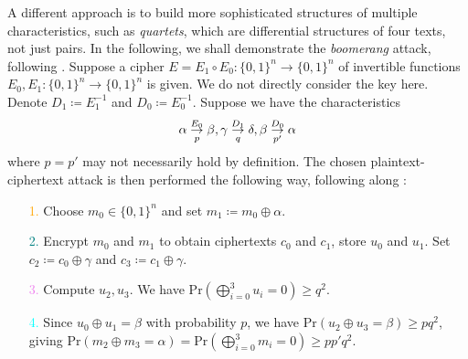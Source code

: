 \documentclass[10pt]{amsart}
\theoremstyle{definition}
\theoremstyle{remark}
\begin{document}
    A different approach is to build more sophisticated structures of multiple characteristics, such as \emph{quartets}, which are differential structures of four texts, not just pairs. In the following, we shall demonstrate the \emph{boomerang} attack, following \cite[pp. 162-164]{Knudsen}. Suppose a cipher \(E = E_1 \circ E_0\colon \{0, 1\}^n \to \{0, 1\}^n\) of invertible functions \(E_0, E_1\colon \{0, 1\}^n \to \{0, 1\}^n\) is given. We do not directly consider the key here. Denote \(D_1 \coloneqq E_1^{-1}\) and \(D_0 \coloneqq E_0^{-1}\). Suppose we have the characteristics
    \begin{align}
        \alpha \overunderset{E_0}{p}{\to} \beta, \gamma \overunderset{D_1}{q}{\to} \delta, \beta \overunderset{D_0}{p'}{\to} \alpha
    \end{align}
    where \(p = p'\) may not necessarily hold by definition. The chosen plaintext-ciphertext attack is then performed the following way, following along :
    \begin{enumerate}[wide]
        \item[\textcolor{orange}{1.}] Choose \(m_0 \in \{0, 1\}^n\) and set \(m_1 \coloneqq m_0 \oplus \alpha\).
        \item[\textcolor{teal}{2.}] Encrypt \(m_0\) and \(m_1\) to obtain ciphertexts \(c_0\) and \(c_1\), store \(u_0\) and \(u_1\). Set \(c_2 \coloneqq c_0 \oplus \gamma\) and \(c_3 \coloneqq c_1 \oplus \gamma\).
        \item[\textcolor{violet}{3.}] Compute \(u_2, u_3\). We have \(\text{Pr}(\bigoplus_{i=0}^3 u_i = 0) \geq q^2\).
        \item[\textcolor{cyan}{4.}] Since \(u_0 \oplus u_1 = \beta\) with probability \(p\), we have \(\text{Pr}(u_2 \oplus u_3 = \beta) \geq pq^2\), giving \(\text{Pr}(m_2 \oplus m_3 = \alpha) = \text{Pr}(\bigoplus_{i=0}^3 m_i = 0) \geq pp'q^2\).
    \end{enumerate}
\end{document}
